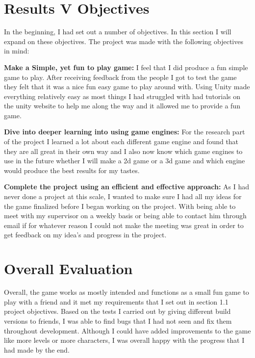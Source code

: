 \section{Results V Objectives}
In the beginning, I had set out a number of objectives. In this section I will expand on these objectives. The project was made with the following objectives in mind:

\bigskip

\textbf {Make a Simple, yet fun to play game:} I feel that I did produce a fun simple game to play. After receiving feedback from the people I got to test the game they felt that it was a nice fun easy game to play around with. Using Unity made everything relatively easy as most things I had struggled with had tutorials on the unity website to help me along the way and it allowed me to provide a fun game.
\newline

\textbf {Dive into deeper learning into using game engines:} For the research part of the project I learned a lot about each different game engine and found that they are all great in their own way and I also now know which game engines to use in the future whether I will make a 2d game or a 3d game and which engine would produce the best results for my tastes.
\newline

\textbf {Complete the project using an efficient and effective approach:} As I had never done a project at this scale, I wanted to make sure I had all my ideas for the game finalized before I began working on the project. With being able to meet with my supervisor on a weekly basis or being able to contact him through email if for whatever reason I could not make the meeting was great in order to get feedback on my idea's and progress in the project.
\newline

\section{Overall Evaluation}
Overall, the game works as mostly intended and functions as a small fun game to play with a friend and it met my requirements that I set out in section 1.1 project objectives. Based on the tests I carried out by giving different build versions to friends, I was able to find bugs that I had not seen and fix them throughout development. Although I could have added improvements to the game like more levels or more characters, I was overall happy with the progress that I had made by the end. 

